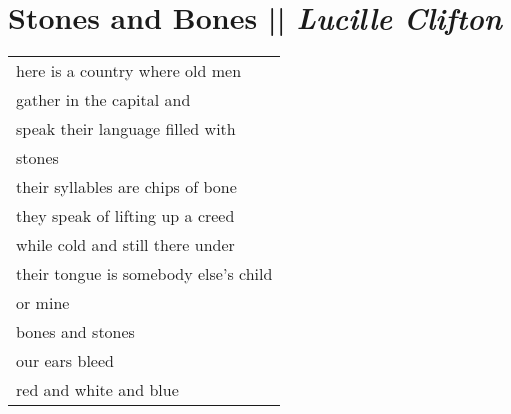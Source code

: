 \section[Stones and Bones]{Stones and Bones || \emph{Lucille Clifton} \hspace*{\fill}  \thepage}
\label{sec:Stones_and_Bones.tex}
\hspace{0pt}
\vfill
\begin{center}
\begin{tabular}{l}
here is a country where old men\\
gather in the capital and\\
speak their language filled with\\
stones\\
their syllables are chips of bone\\
they speak of lifting up a creed\\
while cold and still there under\\
their tongue is somebody else's child\\
or mine\\
bones and stones\\
our ears bleed\\
red and white and blue\\
\end{tabular}
\end{center}
\vfill
\hspace{0pt}